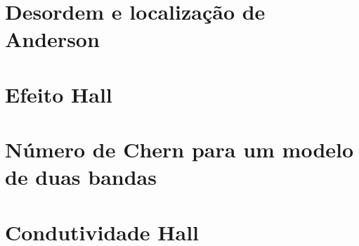\documentclass[a4paper,10pt]{article}
\begin{document}
\pagebreak

\section{Desordem e localização de Anderson}

\pagebreak

\section{Efeito Hall}

\pagebreak

\section{Número de Chern para um modelo de duas bandas}

\pagebreak

\section{Condutividade Hall}


\pagebreak
\end{document}
